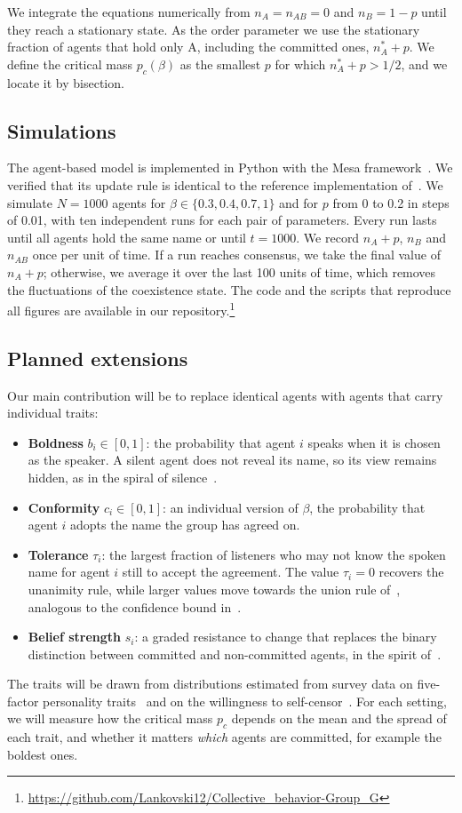 \documentclass[9pt,twoside]{pnas-new}
\begin{document}
We integrate the equations numerically from $n_A=n_{AB}=0$ and $n_B=1-p$ until
they reach a stationary state. As the order parameter we use the stationary
fraction of agents that hold only A, including the committed ones,
$n_A^{*}+p$. We define the critical mass $p_c(\beta)$ as the smallest $p$ for
which $n_A^{*}+p>1/2$, and we locate it by bisection.

\subsection{Simulations}
The agent-based model is implemented in Python with the Mesa
framework~\cite{kazil2020utilizing}. We verified that its update rule is
identical to the reference implementation of~\cite{iacopini2022group}. We
simulate $N=1000$ agents for $\beta\in\{0.3, 0.4, 0.7, 1\}$ and for $p$ from
0 to 0.2 in steps of 0.01, with ten independent runs for each pair of
parameters. Every run lasts until all agents hold the same name or until
$t=1000$. We record $n_A+p$, $n_B$ and $n_{AB}$ once per unit of time. If a run
reaches consensus, we take the final value of $n_A+p$; otherwise, we average it
over the last 100 units of time, which removes the fluctuations of the
coexistence state. The code and the scripts that reproduce all figures are
available in our
repository.\footnote{\url{https://github.com/Lankovski12/Collective_behavior-Group_G}}

\subsection{Planned extensions}
Our main contribution will be to replace identical agents with agents that
carry individual traits:
\begin{itemize}
\item \textbf{Boldness} $b_i\in[0,1]$: the probability that agent $i$ speaks
when it is chosen as the speaker. A silent agent does not reveal its name, so
its view remains hidden, as in the spiral of
silence~\cite{noelleneumann1974spiral}.
\item \textbf{Conformity} $c_i\in[0,1]$: an individual version of $\beta$, the
probability that agent $i$ adopts the name the group has agreed on.
\item \textbf{Tolerance} $\tau_i$: the largest fraction of listeners who may
not know the spoken name for agent $i$ still to accept the agreement. The value
$\tau_i=0$ recovers the unanimity rule, while larger values move towards the
union rule of~\cite{iacopini2022group}, analogous to the confidence bound
in~\cite{deffuant2000mixing}.
\item \textbf{Belief strength} $s_i$: a graded resistance to change that
replaces the binary distinction between committed and non-committed agents, in
the spirit of~\cite{niu2017impact}.
\end{itemize}
The traits will be drawn from distributions estimated from survey data on
five-factor personality traits~\cite{mccrae1992introduction} and on the
willingness to self-censor~\cite{hayes2005willingness}. For each setting, we
will measure how the critical mass $p_c$ depends on the mean and the spread of
each trait, and whether it matters \emph{which} agents are committed, for
example the boldest ones.
\end{document}
